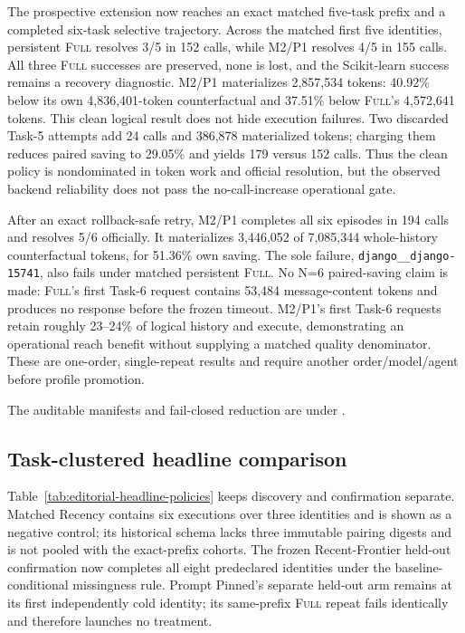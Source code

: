 \documentclass[11pt]{article}
\begin{document}
The prospective extension now reaches an exact matched five-task prefix and a
completed six-task selective trajectory.  Across the matched first five
identities, persistent \textsc{Full} resolves 3/5 in 152 calls, while M2/P1
resolves 4/5 in 155 calls.  All three \textsc{Full} successes are preserved,
none is lost, and the Scikit-learn success remains a recovery diagnostic.
M2/P1 materializes 2,857,534 tokens: 40.92\% below its own 4,836,401-token
counterfactual and 37.51\% below \textsc{Full}'s 4,572,641 tokens.  This clean
logical result does not hide execution failures.  Two discarded Task-5
attempts add 24 calls and 386,878 materialized tokens; charging them reduces
paired saving to 29.05\% and yields 179 versus 152 calls.  Thus the clean
policy is nondominated in token work and official resolution, but the observed
backend reliability does not pass the no-call-increase operational gate.

After an exact rollback-safe retry, M2/P1 completes all six episodes in 194
calls and resolves 5/6 officially.  It materializes 3,446,052 of 7,085,344
whole-history counterfactual tokens, for 51.36\% own saving.  The sole failure,
\texttt{django\_\_django-15741}, also fails under matched persistent
\textsc{Full}.  No N=6 paired-saving claim is made: \textsc{Full}'s first
Task-6 request contains 53,484 message-content tokens and produces no response
before the frozen timeout.  M2/P1's first Task-6 requests retain roughly
23--24\% of logical history and execute, demonstrating an operational reach
benefit without supplying a matched quality denominator.  These are one-order,
single-repeat results and require another order/model/agent before profile
promotion.

The auditable manifests and fail-closed reduction are under
.

\subsection{Task-clustered headline comparison}

Table~\ref{tab:editorial-headline-policies} keeps discovery and confirmation
separate.  Matched Recency contains six executions over three identities and
is shown as a negative control; its historical schema lacks three immutable
pairing digests and is not pooled with the exact-prefix cohorts.  The frozen
Recent-Frontier held-out confirmation now completes all eight predeclared
identities under the baseline-conditional missingness rule.  Prompt Pinned's
separate held-out arm remains at its first independently cold identity; its
same-prefix \textsc{Full} repeat fails identically and therefore launches no
treatment.
\end{document}
